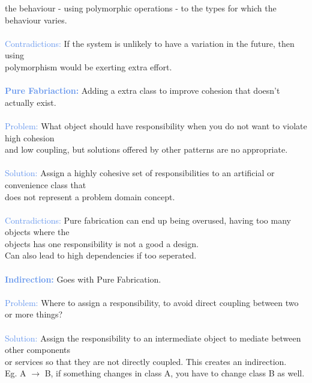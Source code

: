 \documentclass[a4paper,10pt]{article}
\begin{document}
\indent the behaviour - using polymorphic operations - to the types for which the behaviour varies. \\\\
\indent \textcolor{CornflowerBlue}{Contradictions:} If the system is unlikely to have a variation in the future, then using \\
\indent polymorphism would be exerting extra effort.\\ \\
\textcolor{CornflowerBlue}{\textbf{Pure Fabriaction:}} Adding a extra class to improve cohesion that doesn't actually exist. \\\\
\indent \textcolor{CornflowerBlue}{Problem:} What object should have responsibility when you do not want to violate high cohesion \\
\indent and low coupling, but solutions offered by other patterns are no appropriate.\\ \\
\indent \textcolor{CornflowerBlue}{Solution:} Assign a highly cohesive set of responsibilities to an artificial or convenience class that \\
\indent does not represent a problem domain concept. \\ \\
\indent \textcolor{CornflowerBlue}{Contradictions:} Pure fabrication can end up being overused, having too many objects where the\\
\indent objects has one responsibility is not a good a design. \\
\indent Can also lead to high dependencies if too seperated. \\ \\
\textcolor{CornflowerBlue}{\textbf{Indirection:}} Goes with Pure Fabrication. \\\\
\indent \textcolor{CornflowerBlue}{Problem:} Where to assign a responsibility, to avoid direct coupling between two or more things?\\ \\
\indent \textcolor{CornflowerBlue}{Solution:} Assign the responsibility to an intermediate object to mediate between other components \\
\indent or services so that they are not directly coupled. This creates an indirection. \\
\indent Eg. A $\rightarrow$ B, if something changes in class A, you have to change class B as well.		 \\ 
\end{document}
